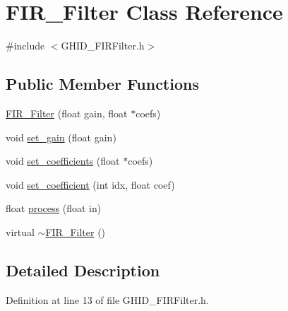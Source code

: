 \hypertarget{class_f_i_r___filter}{\section{\-F\-I\-R\-\_\-\-Filter \-Class \-Reference}
\label{class_f_i_r___filter}
}


{\ttfamily \#include $<$\-G\-H\-I\-D\-\_\-\-F\-I\-R\-Filter.\-h$>$}

\subsection*{\-Public \-Member \-Functions}
\begin{DoxyCompactItemize}
\item 
\hyperlink{class_f_i_r___filter_ae97d19466dfa48503be6d709f77b8527}{\-F\-I\-R\-\_\-\-Filter} (float gain, float $\ast$coefs)
\item 
void \hyperlink{class_f_i_r___filter_ac1b0b8d82bd4f23abf4518413232986f}{set\-\_\-gain} (float gain)
\item 
void \hyperlink{class_f_i_r___filter_a5334613cfd07d61f7ee890cfcf618e98}{set\-\_\-coefficients} (float $\ast$coefs)
\item 
void \hyperlink{class_f_i_r___filter_aa458a2cc5a6f15c6f8a090cfcf0bb56e}{set\-\_\-coefficient} (int idx, float coef)
\item 
float \hyperlink{class_f_i_r___filter_ab953f529e146ac3bf26a48fcc94c5c74}{process} (float in)
\item 
virtual \hyperlink{class_f_i_r___filter_a3a9c258cc21a1a7dc699550529e200fb}{$\sim$\-F\-I\-R\-\_\-\-Filter} ()
\end{DoxyCompactItemize}


\subsection{\-Detailed \-Description}


\-Definition at line 13 of file \-G\-H\-I\-D\-\_\-\-F\-I\-R\-Filter.\-h.



